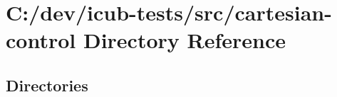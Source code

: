 \section{C\+:/dev/icub-\/tests/src/cartesian-\/control Directory Reference}
\label{dir_684cb237cc589112c257fb2b82bbd35f}
\subsection*{Directories}
\begin{DoxyCompactItemize}
\end{DoxyCompactItemize}
